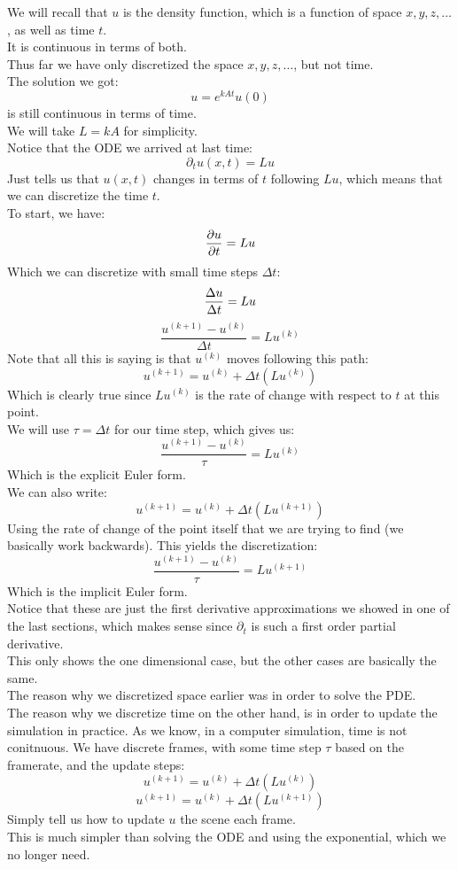 \documentclass[12pt]{article}
\begin{document}
We will recall that $u$ is the density function,
which is a function of space $x, y, z, \dots$,
as well as time $t$. \\
It is continuous in terms of both. \\

Thus far we have only discretized the space
$x, y, z, \dots$, but not time. \\
The solution we got:
\[ u = e^{kAt}u(0) \]
is still continuous in terms of time. \\

We will take $L = kA$ for simplicity. \\
Notice that the ODE we arrived at last time:
\[ \partial_t u(x, t) = Lu \]
Just tells us that $u(x, t)$ changes in terms of $t$
following $Lu$, which means that we can discretize
the time $t$. \\

To start, we have:
\[ \dfrac{\partial u}{\partial t} = Lu \]
Which we can discretize with small time steps
$\Delta t$:
\[ \dfrac{\Delta u}{\Delta t} = Lu \]
\[ \dfrac{u^{(k+1)} - u^{(k)}}{\Delta t} = Lu^{(k)} \]
Note that all this is saying is that
$u^{(k)}$ moves following this path:
\[ u^{(k+1)} = u^{(k)} + \Delta t (Lu^{(k)}) \]
Which is clearly true since $Lu^{(k)}$
is the rate of change with respect to $t$ 
at this point. \\
We will use $\tau = \Delta t$ for our time step,
which gives us:
\[ \dfrac{u^{(k+1)} - u^{(k)}}{\tau} = Lu^{(k)} \]
Which is the explicit Euler form. \\

We can also write:
\[ u^{(k+1)} = u^{(k)} + \Delta t (Lu^{(k+1)}) \]
Using the rate of change
of the point itself that we are trying to find
(we basically work backwards).
This yields the discretization:
\[ \dfrac{u^{(k+1)} - u^{(k)}}{\tau} = Lu^{(k+1)} \]
Which is the implicit Euler form. \\

Notice that these are just the first derivative
approximations we showed in one of the last sections,
which makes sense since $\partial_t$ is
such a first order partial derivative. \\

This only shows the one dimensional case,
but the other cases are basically the same. \\

The reason why we discretized space earlier
was in order to solve the PDE. \\
The reason why we discretize time on the other hand,
is in order to update the simulation in practice.
As we know, in a computer simulation, time is 
not conitnuous.
We have discrete frames, with some time step $\tau$
based on the framerate, and the update steps:
\[ u^{(k+1)} = u^{(k)} + \Delta t (Lu^{(k)}) \]
\[ u^{(k+1)} = u^{(k)} + \Delta t (Lu^{(k+1)}) \]
Simply tell us how to update $u$ the scene each frame. \\
This is much simpler than solving the ODE
and using the exponential,
which we no longer need. \\
\end{document}
